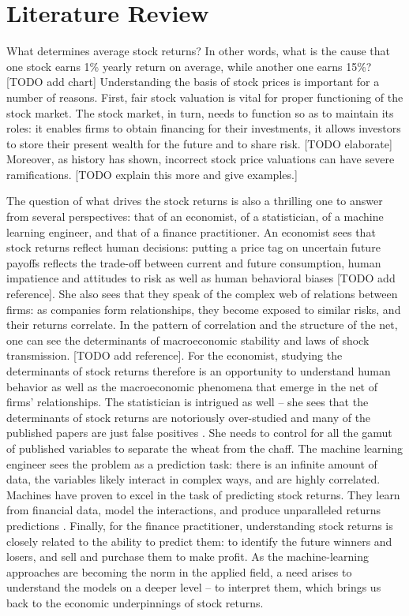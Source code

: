 \chapter{Literature Review}
\label{chap:lit} 
	
 	What determines average stock returns? In other words, what is the cause that one stock earns 1\% yearly return on average, while another one earns 15\%? [TODO add chart]
 	Understanding the basis of stock prices is important for a number of reasons. First, fair stock valuation is vital for proper functioning of the stock market. The stock market, in turn, needs to function so as to maintain its roles: it enables firms to obtain financing for their investments, it allows investors to store their present wealth for the future and to share risk. [TODO elaborate] Moreover, as history has shown, incorrect stock price valuations can have severe ramifications. [TODO explain this more and give examples.]
 	
 	The question of what drives the stock returns is also a thrilling one to answer from several perspectives: that of an economist, of a statistician, of a machine learning engineer, and that of a finance practitioner.
 	An economist sees that stock returns reflect human decisions: putting a price tag on uncertain future payoffs reflects the trade-off between current and future consumption, human impatience and attitudes to risk \citep{cochrane2009asset} as well as human behavioral biases [TODO add reference]. She also sees that they speak of the complex web of relations between firms: as companies form relationships, they become exposed to similar risks, and their returns correlate. In the pattern of correlation and the structure of the net, one can see the determinants of macroeconomic stability and laws of shock transmission. [TODO add reference]. For the economist, studying the determinants of stock returns therefore is an opportunity to understand human behavior as well as the macroeconomic phenomena that emerge in the net of firms' relationships. 
 	The statistician is intrigued as well – she sees that the determinants of stock returns are notoriously over-studied and many of the published papers are just false positives \citep{harvey2016and}. She needs to control for all the gamut of published variables to separate the wheat from the chaff.
 	The machine learning engineer sees the problem as a prediction task: there is an infinite amount of data, the variables likely interact in complex ways, and are highly correlated. Machines have proven to excel in the task of predicting stock returns. They learn from financial data, model the interactions, and produce unparalleled returns predictions \citep{gu2020empirical}.
 	Finally, for the finance practitioner, understanding stock returns is closely related to the ability to predict them: to identify the future winners and losers, and sell and purchase them to make profit. As the machine-learning approaches are becoming the norm in the applied field, a need arises to understand the models on a deeper level – to interpret them, which brings us back to the economic underpinnings of stock returns.
 	
